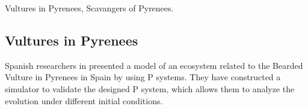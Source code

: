 Vultures in Pyrenees, Scavangers of Pyrenees.

\subsection{Vultures in Pyrenees} %
\label{sub:vultures_in_pyrenees}

Spanish researchers in \cite{Cardona:2009:Vultures} presented a model of an ecosystem related to the Bearded Vulture in Pyrenees in Spain by using P systems. They have constructed a simulator to validate the designed P system, which allows them to analyze the evolution under different initial conditions.

